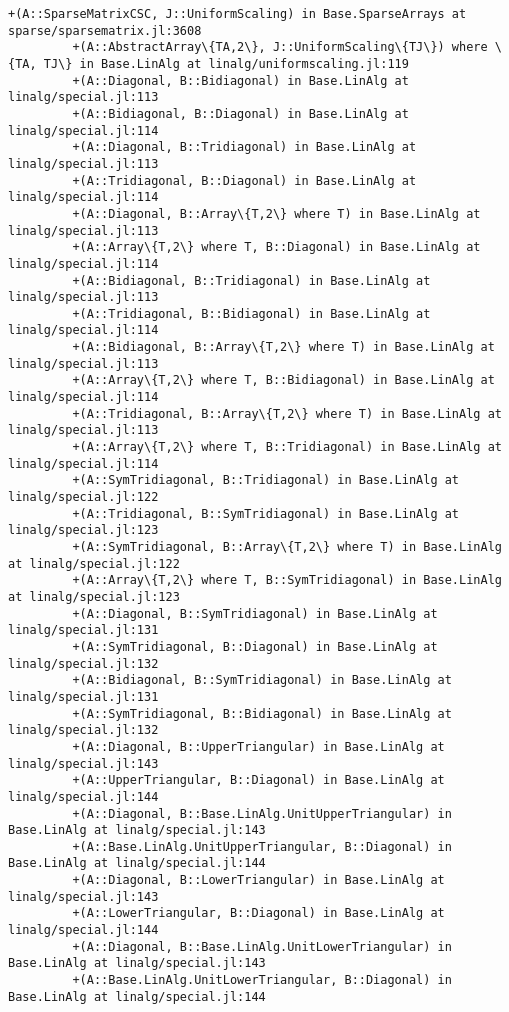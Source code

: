 \documentclass[11pt]{article}
\begin{document}
\begin{Verbatim}[commandchars=\\\{\}]
         +(A::SparseMatrixCSC, J::UniformScaling) in Base.SparseArrays at sparse/sparsematrix.jl:3608
         +(A::AbstractArray\{TA,2\}, J::UniformScaling\{TJ\}) where \{TA, TJ\} in Base.LinAlg at linalg/uniformscaling.jl:119
         +(A::Diagonal, B::Bidiagonal) in Base.LinAlg at linalg/special.jl:113
         +(A::Bidiagonal, B::Diagonal) in Base.LinAlg at linalg/special.jl:114
         +(A::Diagonal, B::Tridiagonal) in Base.LinAlg at linalg/special.jl:113
         +(A::Tridiagonal, B::Diagonal) in Base.LinAlg at linalg/special.jl:114
         +(A::Diagonal, B::Array\{T,2\} where T) in Base.LinAlg at linalg/special.jl:113
         +(A::Array\{T,2\} where T, B::Diagonal) in Base.LinAlg at linalg/special.jl:114
         +(A::Bidiagonal, B::Tridiagonal) in Base.LinAlg at linalg/special.jl:113
         +(A::Tridiagonal, B::Bidiagonal) in Base.LinAlg at linalg/special.jl:114
         +(A::Bidiagonal, B::Array\{T,2\} where T) in Base.LinAlg at linalg/special.jl:113
         +(A::Array\{T,2\} where T, B::Bidiagonal) in Base.LinAlg at linalg/special.jl:114
         +(A::Tridiagonal, B::Array\{T,2\} where T) in Base.LinAlg at linalg/special.jl:113
         +(A::Array\{T,2\} where T, B::Tridiagonal) in Base.LinAlg at linalg/special.jl:114
         +(A::SymTridiagonal, B::Tridiagonal) in Base.LinAlg at linalg/special.jl:122
         +(A::Tridiagonal, B::SymTridiagonal) in Base.LinAlg at linalg/special.jl:123
         +(A::SymTridiagonal, B::Array\{T,2\} where T) in Base.LinAlg at linalg/special.jl:122
         +(A::Array\{T,2\} where T, B::SymTridiagonal) in Base.LinAlg at linalg/special.jl:123
         +(A::Diagonal, B::SymTridiagonal) in Base.LinAlg at linalg/special.jl:131
         +(A::SymTridiagonal, B::Diagonal) in Base.LinAlg at linalg/special.jl:132
         +(A::Bidiagonal, B::SymTridiagonal) in Base.LinAlg at linalg/special.jl:131
         +(A::SymTridiagonal, B::Bidiagonal) in Base.LinAlg at linalg/special.jl:132
         +(A::Diagonal, B::UpperTriangular) in Base.LinAlg at linalg/special.jl:143
         +(A::UpperTriangular, B::Diagonal) in Base.LinAlg at linalg/special.jl:144
         +(A::Diagonal, B::Base.LinAlg.UnitUpperTriangular) in Base.LinAlg at linalg/special.jl:143
         +(A::Base.LinAlg.UnitUpperTriangular, B::Diagonal) in Base.LinAlg at linalg/special.jl:144
         +(A::Diagonal, B::LowerTriangular) in Base.LinAlg at linalg/special.jl:143
         +(A::LowerTriangular, B::Diagonal) in Base.LinAlg at linalg/special.jl:144
         +(A::Diagonal, B::Base.LinAlg.UnitLowerTriangular) in Base.LinAlg at linalg/special.jl:143
         +(A::Base.LinAlg.UnitLowerTriangular, B::Diagonal) in Base.LinAlg at linalg/special.jl:144

\end{Verbatim}
\end{document}
